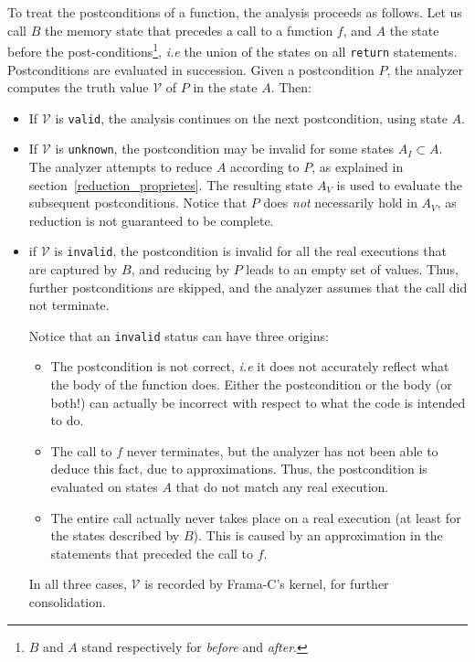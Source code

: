 \documentclass{frama-c-book}
\begin{document}
To treat the postconditions of a function, the analysis proceeds as
follows.  Let us call $B$ the memory state that precedes a call to a
function $f$, and $A$ the state before the
post-conditions\footnote{$B$ and $A$ stand respectively for
  \emph{before} and \emph{after}.}, {\it i.e} the union of the states
on all \lstinline|return| statements. Postconditions are evaluated in
succession. Given a postcondition $P$, the analyzer computes
the truth value $\mathcal{V}$ of $P$ in the state $A$. %
Then:
\begin{itemize}
\item If $\mathcal{V}$ is \lstinline|valid|, the analysis continues on
  the next postcondition, using state $A$.

\item If $\mathcal{V}$ is \lstinline|unknown|, the postcondition may
  be invalid for some states $A_I \subset A$.  The analyzer attempts to reduce
  $A$ according to $P$, as explained in section~\ref{reduction_proprietes}.
  The resulting state $A_V$ is used to evaluate the subsequent postconditions.
  Notice that $P$ does \emph{not} necessarily hold in $A_V$, as reduction is not
  guaranteed to be complete.

\item if $\mathcal{V}$ is \lstinline|invalid|, the postcondition is
  invalid for all the real executions that are captured by
  $B$, and reducing by $P$ leads to an empty set of values. Thus,
  further postconditions are skipped, and the analyzer assumes
  that the call did not terminate.

Notice that an \lstinline|invalid| status can have three origins:
\begin{itemize}
\item The postcondition is not correct, {\it i.e} it does not accurately
  reflect what the body of the function does. Either
  the postcondition or the body (or both!) can actually be incorrect
  with respect to what the code is intended to do.

\item The call to $f$ never terminates, but the analyzer has not been
  able to deduce this fact, due to approximations. Thus, the
  postcondition is evaluated on states $A$ that do not match any real
  execution.

\item The entire call actually never takes place on a real
  execution (at least for the states described by $B$). This is
  caused by an approximation in the statements that preceded the
  call to $f$.
\end{itemize}

In all three cases, $\mathcal{V}$ is recorded by Frama-C's kernel, for
further consolidation.

\end{itemize}
\end{document}
